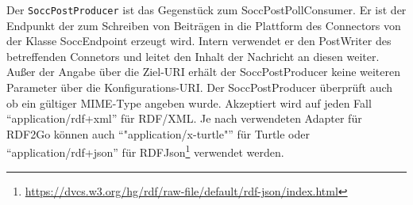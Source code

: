 Der \texttt{SoccPostProducer} ist das Gegenstück zum SoccPostPollConsumer. Er ist der Endpunkt der zum Schreiben von Beiträgen in die Plattform des Connectors von der Klasse SoccEndpoint erzeugt wird. Intern verwendet er den PostWriter des betreffenden Connetors und leitet den Inhalt der Nachricht an diesen weiter. Außer der Angabe über die Ziel-URI erhält der SoccPostProducer keine weiteren Parameter über die Konfigurations-URI. Der SoccPostProducer überprüft auch ob ein gültiger MIME-Type angeben wurde. Akzeptiert wird auf jeden Fall \enquote{application/rdf+xml} für RDF/XML. Je nach verwendeten Adapter für RDF2Go können auch \enquote{"application/x-turtle"} für Turtle oder \enquote{application/rdf+json} für RDFJson\footnote{\url{https://dvcs.w3.org/hg/rdf/raw-file/default/rdf-json/index.html}} verwendet werden.



